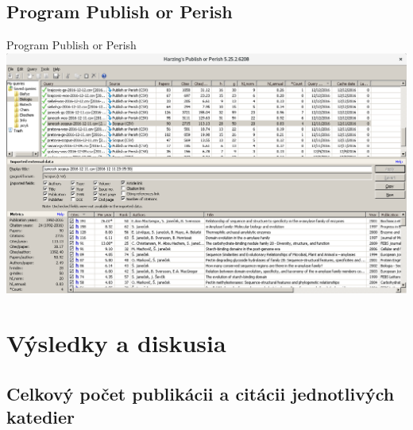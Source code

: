 \documentclass{beamer}
\begin{document}
\subsection{Program Publish or Perish}

%
%
\begin{frame}{Program Publish or Perish}
  \includegraphics[scale=0.255]{publish-or-perish_wine.png} \\[-1ex]
  \parbox{\textwidth}{\centering\tiny \citet{Harzing2011}}
\end{frame}



%
%



\section{Výsledky a diskusia}

\subsection{Celkový počet publikácii a citácii jednotlivých katedier}
\end{document}

